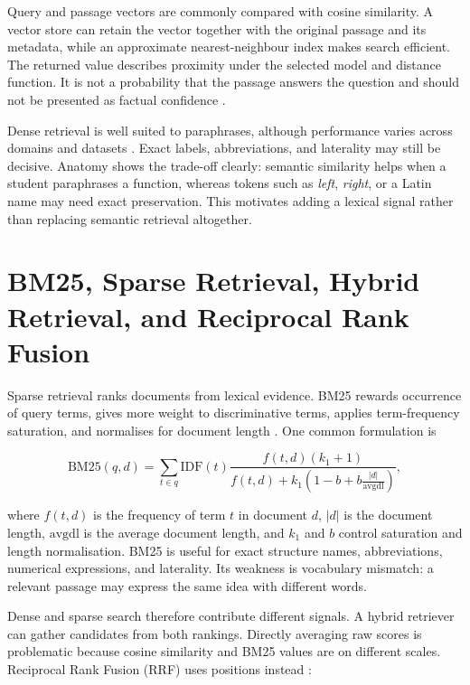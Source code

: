 Query and passage vectors are commonly compared with cosine similarity. A vector store can retain the vector together with the original passage and its metadata, while an approximate nearest-neighbour index makes search efficient. The returned value describes proximity under the selected model and distance function. It is not a probability that the passage answers the question and should not be presented as factual confidence \parencite{reimers2019,minilmModelCard}.

Dense retrieval is well suited to paraphrases, although performance varies across domains and datasets \parencite{thakur2021beir}. Exact labels, abbreviations, and laterality may still be decisive. Anatomy shows the trade-off clearly: semantic similarity helps when a student paraphrases a function, whereas tokens such as \emph{left}, \emph{right}, or a Latin name may need exact preservation. This motivates adding a lexical signal rather than replacing semantic retrieval altogether.

\section{BM25, Sparse Retrieval, Hybrid Retrieval, and Reciprocal Rank Fusion}
\label{sec:hybrid-retrieval-background}

Sparse retrieval ranks documents from lexical evidence. BM25 rewards occurrence of query terms, gives more weight to discriminative terms, applies term-frequency saturation, and normalises for document length \parencite{robertson2009}. One common formulation is

\begin{equation}
\mathrm{BM25}(q,d)=\sum_{t\in q}\mathrm{IDF}(t)
\frac{f(t,d)(k_1+1)}{f(t,d)+k_1\left(1-b+b\frac{|d|}{\mathrm{avgdl}}\right)},
\label{eq:bm25}
\end{equation}

where $f(t,d)$ is the frequency of term $t$ in document $d$, $|d|$ is the document length, $\mathrm{avgdl}$ is the average document length, and $k_1$ and $b$ control saturation and length normalisation. BM25 is useful for exact structure names, abbreviations, numerical expressions, and laterality. Its weakness is vocabulary mismatch: a relevant passage may express the same idea with different words.

Dense and sparse search therefore contribute different signals. A hybrid retriever can gather candidates from both rankings. Directly averaging raw scores is problematic because cosine similarity and BM25 values are on different scales. Reciprocal Rank Fusion (RRF) uses positions instead \parencite{cormack2009}:

